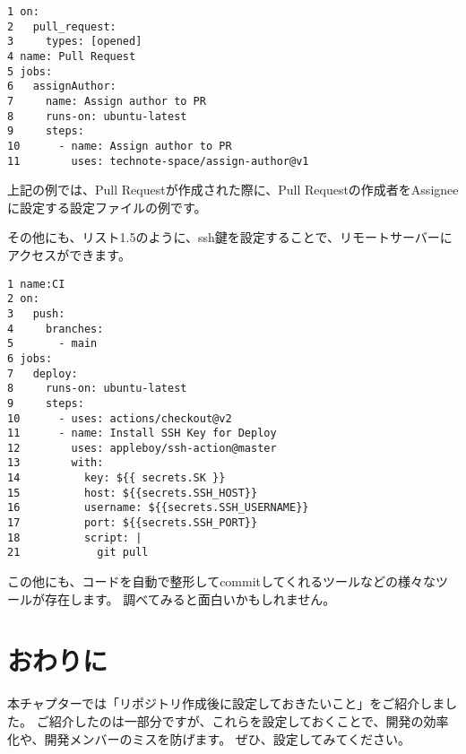 \begin{tcolorbox}[title=リスト1.4 .github/workflows/pr.yml]
  \begin{verbatim}
1 on:
2   pull_request:
3     types: [opened]
4 name: Pull Request
5 jobs:
6   assignAuthor:
7     name: Assign author to PR
8     runs-on: ubuntu-latest
9     steps:
10      - name: Assign author to PR
11        uses: technote-space/assign-author@v1
\end{verbatim}
\end{tcolorbox}

上記の例では、Pull Requestが作成された際に、Pull Requestの作成者をAssigneeに設定する設定ファイルの例です。

その他にも、リスト1.5のように、ssh鍵を設定することで、リモートサーバーにアクセスができます。
\begin{tcolorbox}[title=リスト1.5 .github/workflows/deploy.yml]
  \begin{verbatim}
1 name:CI
2 on:
3   push:
4     branches:
5       - main
6 jobs:
7   deploy:
8     runs-on: ubuntu-latest
9     steps:
10      - uses: actions/checkout@v2
11      - name: Install SSH Key for Deploy
12        uses: appleboy/ssh-action@master
13        with:
14          key: ${{ secrets.SK }}
15          host: ${{secrets.SSH_HOST}}
16          username: ${{secrets.SSH_USERNAME}}
17          port: ${{secrets.SSH_PORT}}
18          script: |
21            git pull
\end{verbatim}
\end{tcolorbox}

この他にも、コードを自動で整形してcommitしてくれるツールなどの様々なツールが存在します。
調べてみると面白いかもしれません。

\section{おわりに}
本チャプターでは「リポジトリ作成後に設定しておきたいこと」をご紹介しました。
ご紹介したのは一部分ですが、これらを設定しておくことで、開発の効率化や、開発メンバーのミスを防げます。
ぜひ、設定してみてください。

